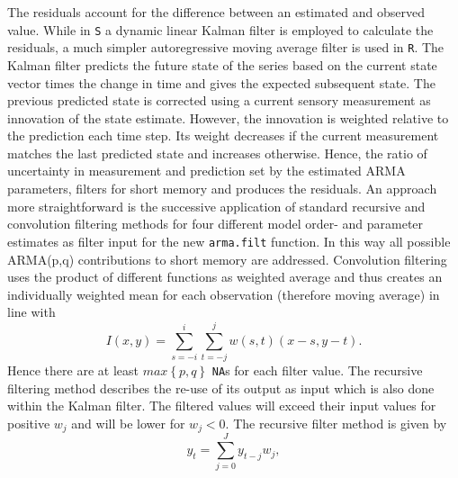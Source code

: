 \documentclass[12pt]{article}
\newcommand{\code}[1]{\texttt{#1}}
\begin{document}
The residuals account for the difference between an estimated and observed value.
While in \code{S} a dynamic linear Kalman filter is employed to calculate the residuals, a much simpler autoregressive moving average filter is used in \code{R}.
%
The Kalman filter predicts the future state of the series %
based on the current state vector %
times the change in time and gives the expected subsequent state.  
The previous predicted state is corrected using a current sensory measurement %
as innovation of the state estimate. 
However, the innovation is weighted relative to the prediction each time step. Its weight decreases if the current measurement matches the last predicted state and increases otherwise. 
%
Hence, the ratio of uncertainty in measurement and prediction set by the estimated ARMA parameters, filters for short memory and produces the residuals.
An approach more straightforward is the successive application of standard recursive and convolution filtering methods for four different  model order- and parameter estimates as filter input for the new \code{arma.filt} function.
In this way all possible ARMA(p,q) contributions to short memory are addressed. 
Convolution filtering %
uses the product of different functions as weighted average and thus creates an individually weighted mean for each observation (therefore moving average) in line with
\begin{equation}
\label{eq:ConvolutionFilter}
	I(x,y) = \sum_{s=-i}^{i} \sum_{t=-j}^{j} w(s,t) (x-s,y-t).
\end{equation}
Hence there are at least \(max\left\lbrace p,q \right\rbrace \) \code{NA}s for each filter value. 
The recursive filtering method describes the re-use of its output as input which is also done within the Kalman filter. The filtered values will exceed their input values for positive \(w_j\) and will be lower for \(w_j <0\). The recursive filter method is given by
\begin{equation}
\label{eq:RecursiveFilter}
	y_t = \sum_{j=0}^{J} y_{t-j} w_j,
\end{equation}
\end{document}
